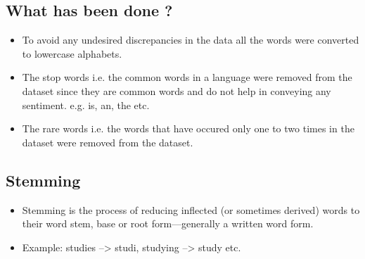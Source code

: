 \documentclass[12pt]{article}
\begin{document}
\subsection{What has been done ?}
\begin{itemize}
    \item To avoid any undesired discrepancies in the data all the words were converted to lowercase alphabets.
    \item The stop words i.e. the common words in a language were removed from the dataset since they are common words and do not help in conveying any sentiment. e.g. is, an, the etc.
    \item The rare words i.e. the words that have occured only one to two times in the dataset were removed from the dataset.
\end{itemize}

\subsection{Stemming}
\begin{itemize}
    \item Stemming is the process of reducing inflected (or sometimes derived) words to their word stem, base or root form—generally a written word form.
    \item Example: studies --> studi, studying --> study etc.
    
\end{itemize}
\end{document}
